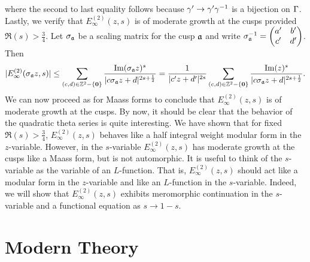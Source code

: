 \documentclass[12pt,oneside]{book}
\begin{document}
      where the second to last equality follows because $\gamma' \to \gamma'\gamma^{-1}$ is a bijection on $\Gamma$. Lastly, we verify that $E_{\infty}^{(2)}(z,s)$ is of moderate growth at the cusps provided $\Re(s) > \frac{3}{4}$. Let $\sigma_{\mathfrak{a}}$ be a scaling matrix for the cusp $\mathfrak{a}$ and write $\sigma_{\mathfrak{a}}^{-1} = \begin{pmatrix} a' & b' \\ c' & d' \end{pmatrix}$. Then
      \[
        |E_{\infty}^{(2)}(\sigma_{\mathfrak{a}}z,s)| \le \sum_{(c,d) \in \mathbb{Z}^{2}-\{\mathbf{0}\}}\frac{\mathrm{Im}(\sigma_{\mathfrak{a}}z)^{s}}{|c\sigma_{\mathfrak{a}}z+d|^{2s+\frac{1}{2}}} = \frac{1}{|c'z+d'|^{2s}}\sum_{(c,d) \in \mathbb{Z}^{2}-\{\mathbf{0}\}}\frac{\mathrm{Im}(z)^{s}}{|c\sigma_{\mathfrak{a}}z+d|^{2s+\frac{1}{2}}}.
      \]
      We can now proceed as for Maass forms to conclude that $E_{\infty}^{(2)}(z,s)$ is of moderate growth at the cusps. By now, it should be clear that the behavior of the quadratic theta series is quite interesting. We have shown that for fixed $\Re(s) > \frac{3}{4}$, $E_{\infty}^{(2)}(z,s)$ behaves like a half integral weight modular form in the $z$-variable. However, in the $s$-variable $E_{\infty}^{(2)}(z,s)$ has moderate growth at the cusps like a Maass form, but is not automorphic. It is useful to think of the $s$-variable as the variable of an $L$-function. That is, $E_{\infty}^{(2)}(z,s)$ should act like a modular form in the $z$-variable and like an $L$-function in the $s$-variable. Indeed, we will show that $E_{\infty}^{(2)}(z,s)$ exhibits meromorphic continuation in the $s$-variable and a functional equation as $s \to 1-s$.
    \section{}
\part{Modern Theory}
\end{document}
